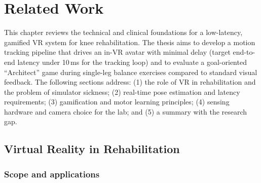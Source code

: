 %

\chapter{Related Work}\label{ch:related}

This chapter reviews the technical and clinical foundations for a low-latency, gamified VR system for knee rehabilitation. The thesis aims to develop a motion tracking pipeline that drives an in-VR avatar with minimal delay (target end-to-end latency under 10\,ms for the tracking loop) and to evaluate a goal-oriented ``Architect'' game during single-leg balance exercises compared to standard visual feedback. The following sections address: (1) the role of VR in rehabilitation and the problem of simulator sickness; (2) real-time pose estimation and latency requirements; (3) gamification and motor learning principles; (4) sensing hardware and camera choice for the lab; and (5) a summary with the research gap.

\section{Virtual Reality in Rehabilitation}

\subsection{Scope and applications}

